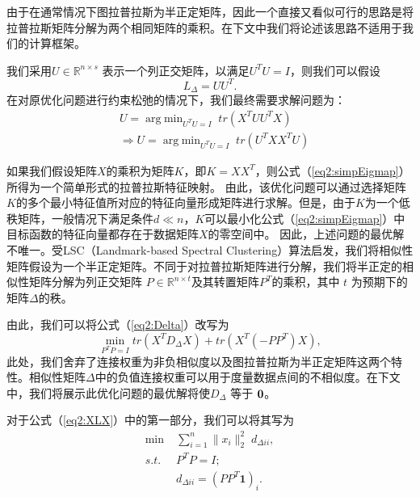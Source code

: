 由于在通常情况下图拉普拉斯为半正定矩阵，因此一个直接又看似可行的思路是将拉普拉斯矩阵分解为两个相同矩阵的乘积。在下文中我们将论述该思路不适用于我们的计算框架。

我们采用$U\in \mathbb{R}^{n\times s}$ 表示一个列正交矩阵，以满足$U^TU = I$，则我们可以假设
\begin{equation}
	L_\Delta = UU^T.
\end{equation}
在对原优化问题进行约束松弛的情况下，我们最终需要求解问题为：
\begin{equation}
	\begin{split}
		&U = \mathop{\mathrm{arg\;min}}_{U^TU=I}\; tr(X^TUU^TX) \\
		&\Rightarrow U = \mathop{\mathrm{arg\;min}}_{U^TU=I} \;tr(U^TXX^TU)
	\end{split}
	\label{eq2:simpEigmap}
\end{equation}

如果我们假设矩阵$X$的乘积为矩阵$K$，即$K = XX^T$，则公式（\ref{eq2:simpEigmap}）所得为一个简单形式的拉普拉斯特征映射\cite{belkin2001laplacian}。
由此，该优化问题可以通过选择矩阵$K$的多个最小特征值所对应的特征向量形成矩阵进行求解。但是，由于$K$为一个低秩矩阵，一般情况下满足条件$d\ll n$，$K$可以最小化公式（\ref{eq2:simpEigmap}）中目标函数的特征向量都存在于数据矩阵$X$的零空间中。
因此，上述问题的最优解不唯一。受LSC（Landmark-based Spectral Clustering）算法\cite{chen2011large}启发，我们将相似性矩阵假设为一个半正定矩阵。不同于对拉普拉斯矩阵进行分解，我们将半正定的相似性矩阵分解为列正交矩阵 $P\in \mathbb{R}^{n\times t}$及其转置矩阵$P^T$的乘积，其中 $t$ 为预期下的矩阵$\Delta$的秩。

由此，我们可以将公式（\ref{eq2:Delta}）改写为
\begin{equation}
	\mathop{\mathrm{min}}_{P^TP=I} tr(X^TD_\Delta X)+tr(X^T(-PP^T)X),
	\label{eq2:XLX}
\end{equation}
此处，我们舍弃了连接权重为非负相似度以及图拉普拉斯为半正定矩阵这两个特性。相似性矩阵$\Delta$中的负值连接权重可以用于度量数据点间的不相似度。在下文中，我们将展示此优化问题的最优解将使$D_\Delta$ 等于 $\bf0$。

对于公式（\ref{eq2:XLX}）中的第一部分，我们可以将其写为
\begin{equation}
	\begin{split}
		\mathop{\mathrm{min}}\;&\sum_{i=1}^{n} \|x_i\|_2^2\;d_{\Delta ii},\\
		s.t. \;\; &P^TP=I;\\
		&d_{\Delta ii}=(PP^T\textbf{1})_i.
	\end{split}
	\label{eq2:XD}
\end{equation}

